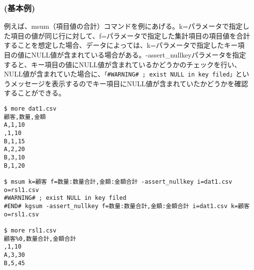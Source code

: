 \subsubsection*{(基本例) }
例えば、msum（項目値の合計）コマンドを例にあげる。k=パラメータで指定した項目の値が同じ行に対して、f=パラメータで指定した集計項目の項目値を合計することを想定した場合、データによっては、k=パラメータで指定したキー項目の値にNULL値が含まれている場合がある。-assert\_nullkeyパラメータを指定すると、キー項目の値にNULL値が含まれているかどうかのチェックを行い、NULL値が含まれていた場合に、\verb|「#WARNING# ; exist NULL in key filed」|というメッセージを表示するのでキー項目にNULL値が含まれていたかどうかを確認することができる。

\begin{Verbatim}[baselinestretch=0.7,frame=single]
$ more dat1.csv
顧客,数量,金額
A,1,10
,1,10
B,1,15
A,2,20
B,3,10
B,1,20

$ msum k=顧客 f=数量:数量合計,金額:金額合計 -assert_nullkey i=dat1.csv o=rsl1.csv
#WARNING# ; exist NULL in key filed
#END# kgsum -assert_nullkey f=数量:数量合計,金額:金額合計 i=dat1.csv k=顧客 o=rsl1.csv

$ more rsl1.csv
顧客%0,数量合計,金額合計
,1,10
A,3,30
B,5,45
\end{Verbatim}
